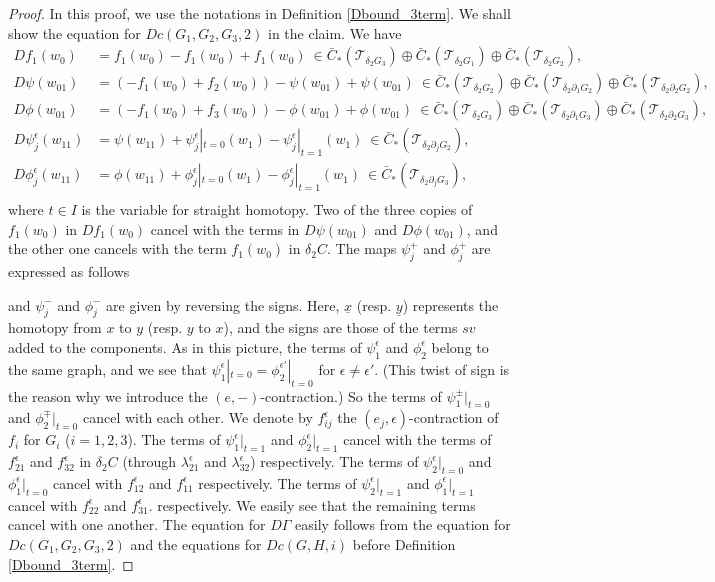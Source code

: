 \documentclass[reqno]{amsart}
\theoremstyle{definition}
\theoremstyle{plain}
\newcommand{\eps}{\epsilon}
\newcommand{\TT}{\mathcal{T}} %
\begin{document}
\begin{proof}
In this proof, we use the notations in Definition \ref{Dbound_3term}. We shall show the equation for $Dc(G_1,G_2,G_3,2)$ in the claim. 
 We have 
\[
\begin{split}
Df_1(w_0)&=f_1(w_0) -f_1(w_0) +f_1(w_0)\ \in \bar C_*(\TT_{\delta_2G_3})\oplus\bar C_*(\TT_{\delta_2G_1})\oplus\bar C_*(\TT_{\delta_2G_2}), \\
D\psi(w_{01})&=(-f_1(w_0)+f_2(w_0))-\psi(w_{01})+\psi(w_{01})\ \in \bar C_*(\TT_{\delta_2G_2})\oplus\bar C_*(\TT_{\delta_2\partial _1G_2})\oplus\bar C_*(\TT_{\delta_2\partial_2 G_2}), \\
D\phi(w_{01})&=(-f_1(w_0)+f_3(w_0))-\phi(w_{01})+\phi(w_{01})\ \in \bar C_*(\TT_{\delta_2G_3})\oplus\bar C_*(\TT_{\delta_2\partial _1G_3})\oplus\bar C_*(\TT_{\delta_2\partial_2 G_3}), \\
D\psi^\eps_j(w_{11})&=\psi (w_{11})+\psi^\eps_j|_{t=0}(w_1)-\psi^\eps_j|_{t=1}(w_1) \ \in\bar C_*(\TT_{\delta_2\partial_jG_2}), \\
D\phi^\eps_j(w_{11})&=\phi (w_{11})+\phi^\eps_j|_{t=0}(w_1)-\phi^\eps_j|_{t=1}(w_1)\ \in\bar C_*(\TT_{\delta_2\partial_jG_3}), \\
\end{split}
\]
where $t\in I$ is the variable for straight homotopy. 
Two of the three copies of $f_1(w_0)$ in $Df_1(w_0)$ cancel with the terms in $D\psi(w_{01})$ and $D\phi(w_{01})$, and the other one cancels with the term  $f_1(w_0)$ in $\delta_2C$.  The maps $\psi_j^+$ and $\phi_j^+$ are expressed as follows
\begin{center}
\vspace{2mm}
\end{center}
and $\psi_j^-$ and $\phi_j^-$ are given by reversing the signs. Here, $\underline{x}$ (resp. $\underline{y}$) represents the homotopy from $x$ to $y$ (resp. $y$ to $x$), and the signs are those of the terms $sv$ added to the components.
As in this picture, the terms of $\psi^\eps_1$ and $\phi^\eps_2$ belong to the same graph,  and we see that $\psi^\eps_1|_{t=0}=\phi^{\eps'}_2|_{t=0}$ for $\eps\not=\eps'$. (This twist of sign is the reason why we introduce the $(e,-)$-contraction.) So the terms of  $\psi^\pm_1|_{t=0}$ and $\phi^\mp_2|_{t=0}$ cancel with each other. We denote by $f_{ij}^\eps$ the $(e_j,\eps)$-contraction of $f_i$ for $G_i$ ($i=1,2,3$). The terms of  $\psi^\eps_1|_{t=1}$ and $\phi^\eps_2|_{t=1}$ cancel with the terms of $f^\eps_{21}$ and $f^\eps_{32}$ in $\delta_2C$ (through $\lambda^\eps_{21}$ and $\lambda^\eps_{32}$) respectively. The terms of $\psi^\eps_2|_{t=0}$ and $\phi^\eps_1|_{t=0}$ cancel with  $f^\eps_{12}$ and $f^\eps_{11}$ respectively. The terms of $\psi^\eps_2|_{t=1}$ and $\phi^\eps_1|_{t=1}$ cancel with $f^\eps_{22}$ and $f^\eps_{31}$. respectively. We easily see that the remaining terms cancel with one another. The equation for $D\Gamma$ easily follows from the equation for $Dc(G_1,G_2,G_3,2)$ and the equations for $Dc(G,H,i)$ before Definition \ref{Dbound_3term}.
\end{proof}
\end{document}
